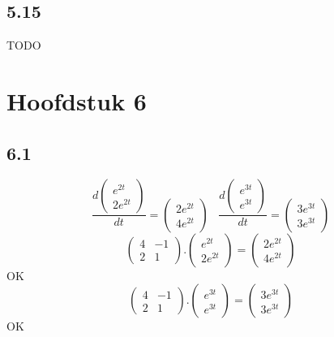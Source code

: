 \documentclass[11pt]{article}
\begin{document}
\subsection*{5.15}
TODO

\section*{Hoofdstuk 6}
\subsection*{6.1}
\[
\frac{d\begin{pmatrix}
e^{2t}\\2e^{2t}
\end{pmatrix}}{dt}
=
\begin{pmatrix}
2e^{2t}\\4e^{2t}
\end{pmatrix}
\;\;\;
\frac{d\begin{pmatrix}
e^{3t}\\e^{3t}
\end{pmatrix}}{dt}
=
\begin{pmatrix}
3e^{3t}\\3e^{3t}
\end{pmatrix}
\]
\[
\begin{pmatrix}
4 & -1 \\
2 & 1
\end{pmatrix}
.
\begin{pmatrix}
e^{2t}\\2e^{2t}
\end{pmatrix}
=
\begin{pmatrix}
2e^{2t}\\4e^{2t}
\end{pmatrix}
\]
OK
\[
\begin{pmatrix}
4 & -1 \\
2 & 1
\end{pmatrix}
.
\begin{pmatrix}
e^{3t}\\e^{3t}
\end{pmatrix}
=
\begin{pmatrix}
3e^{3t}\\3e^{3t}
\end{pmatrix}
\]
OK
\end{document}

